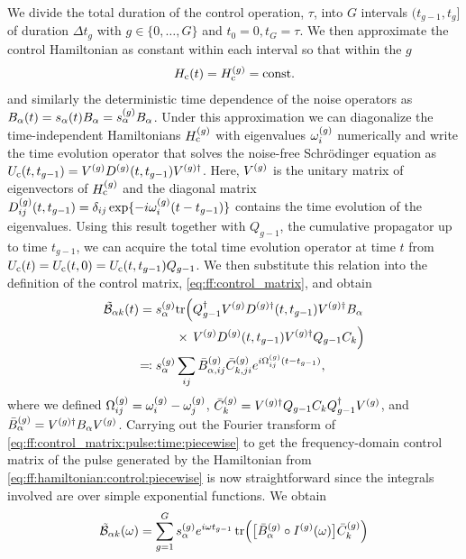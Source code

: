 We divide the total duration of the control operation, $\tau$, into $G$ intervals $(t_{g-1}, t_{g}]$ of duration $\Delta t_g$ with $g\in\lbrace 0,\dotsc,G\rbrace$ and $t_0 =  0, t_G = \tau$.
We then approximate the control Hamiltonian as constant within each interval so that within the $g$
\begin{align}\label{eq:ff:hamiltonian:control:piecewise}
    H_{\mathrm{c}}(t) = H_{\mathrm{c}}^{(g)} = \mathrm{const.}
\end{align}
and similarly the deterministic time dependence of the noise operators as $B_\alpha(t) = s_\alpha(t)B_\alpha = s_\alpha^{(g)}B_\alpha$.
Under this approximation we can diagonalize the time-independent Hamiltonians $H_{\mathrm{c}}^{(g)}$ with eigenvalues $\omega_i^{(g)}$ numerically and write the time evolution operator that solves the noise-free Schrödinger equation as $U_{\mathrm{c}}(t, t_{g-1}) = V^{(g)} D^{(g)}(t, t_{g-1})V^{(g)\dagger}$.
Here, $V^{(g)}$ is the unitary matrix of eigenvectors of $H_{\mathrm{c}}^{(g)}$ and the diagonal matrix $D_{ij}^{(g)}(t, t_{g-1}) = \delta_{ij}\exp\{-i\omega_i^{(g)}(t - t_{g-1})\}$ contains the time evolution of the eigenvalues.
Using this result together with $Q_{g-1}$, the cumulative propagator up to time $t_{g-1}$, we can acquire the total time evolution operator at time $t$ from $U_{\mathrm{c}}(t) = U_{\mathrm{c}}(t,0) = U_{\mathrm{c}}(t, t_{g-1}) Q_{g-1}$.
We then substitute this relation into the definition of the control matrix, \cref{eq:ff:control_matrix}, and obtain
\begin{align}
    \tilde{\mathcal{B}}_{\alpha k}(t) = s_\alpha^{(g)}&\mathrm{tr}\Bigl(Q_{g-1}^\dagger V^{(g)} D^{(g)\dagger}(t, t_{g-1}) V^{(g)\dagger} B_\alpha \notag\\
        & \times\,V^{(g)} D^{(g)}(t, t_{g-1})V^{(g)\dagger} Q_{g-1} C_k\Bigr) \\
        \eqqcolon s_\alpha^{(g)}&\sum_{ij}\bar{B}_{\alpha,ij}^{(g)}\bar{C}_{k,ji}^{(g)}
        e^{i\Omega_{ij}^{(g)}(t - t_{g-1})}, \label{eq:ff:control_matrix:pulse:time:piecewise}
\end{align}
where we defined $\Omega_{ij}^{(g)} = \omega_i^{(g)} - \omega_j^{(g)}$, $\bar{C}_{k}^{(g)} = V^{(g)\dagger} Q_{g-1} C_k Q_{g-1}^\dagger V^{(g)}$, and $\bar{B}_{\alpha}^{(g)} = V^{(g)\dagger} B_\alpha V^{(g)}$.
Carrying out the Fourier transform of \cref{eq:ff:control_matrix:pulse:time:piecewise} to get the frequency-domain control matrix of the pulse generated by the Hamiltonian from \cref{eq:ff:hamiltonian:control:piecewise} is now straightforward since the integrals involved are over simple exponential functions.
We obtain
\begin{equation}\label{eq:ff:control_matrix:pulse:freq:ff:calculation}
    \tilde{\mathcal{B}}_{\alpha k}(\omega) = \sum_{g = 1}^G s_\alpha^{(g)}e^{i\omega t_{g-1}}\tr(\bigl[\bar{B}_\alpha^{(g)}\circ I^{(g)}(\omega)\bigr]\bar{C}_k^{(g)})
\end{equation}

